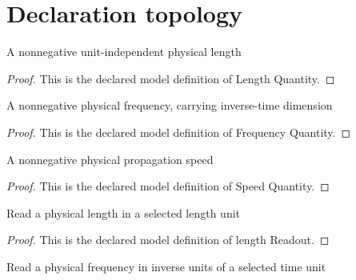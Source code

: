 \section{Declaration topology}
\begin{definition}
  \label{def:physics:phyx-mini-0247:phyxminiproblems-problemphyxmini0247-lengthquantity}
  A nonnegative unit-independent physical length
\end{definition}
\begin{proof}
  This is the declared model definition of Length Quantity.
\end{proof}
\begin{definition}
  \label{def:physics:phyx-mini-0247:phyxminiproblems-problemphyxmini0247-frequencyquantity}
  A nonnegative physical frequency, carrying inverse-time dimension
\end{definition}
\begin{proof}
  This is the declared model definition of Frequency Quantity.
\end{proof}
\begin{definition}
  \label{def:physics:phyx-mini-0247:phyxminiproblems-problemphyxmini0247-speedquantity}
  A nonnegative physical propagation speed
\end{definition}
\begin{proof}
  This is the declared model definition of Speed Quantity.
\end{proof}
\begin{definition}
  \label{def:physics:phyx-mini-0247:phyxminiproblems-problemphyxmini0247-lengthreadout}
  Read a physical length in a selected length unit
\end{definition}
\begin{proof}
  This is the declared model definition of length Readout.
\end{proof}
\begin{definition}
  \label{def:physics:phyx-mini-0247:phyxminiproblems-problemphyxmini0247-frequencyreadout}
  Read a physical frequency in inverse units of a selected time unit
\end{definition}
